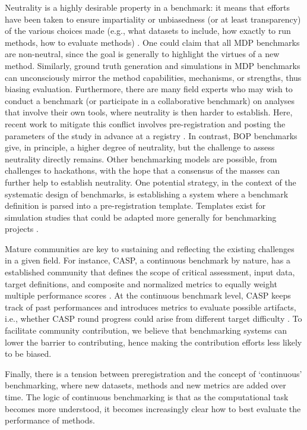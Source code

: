 \documentclass[11pt]{article}
\begin{document}
Neutrality is a highly desirable property in a benchmark: it means that efforts have been taken to ensure impartiality or unbiasedness (or at least transparency) of the various choices made (e.g., what datasets to include, how exactly to run methods, how to evaluate methods) \cite{Weber2019-el, Jelizarow2010-kr}. One could claim that all MDP benchmarks are non-neutral, since the goal is generally to highlight the virtues of a new method. Similarly, ground truth generation and simulations in MDP benchmarks can unconsciously mirror the method capabilities, mechanisms, or strengths, thus biasing evaluation. Furthermore, there are many field experts who may wish to conduct a benchmark (or participate in a collaborative benchmark) on analyses that involve their own tools, where neutrality is then harder to establish. Here, recent work to mitigate this conflict involves pre-registration and posting the parameters of the study in advance at a registry \cite{Sullivan2019-wh, Olevska2021-if, Teo2024-wk}. In contrast, BOP benchmarks give, in principle, a higher degree of neutrality, but the challenge to assess neutrality directly remains. Other benchmarking models are possible, from challenges to hackathons, with the hope that a consensus of the masses can further help to establish neutrality. One potential strategy, in the context of the systematic design of benchmarks, is establishing a system where a benchmark definition is parsed into a pre-registration template. Templates exist for simulation studies that could be adapted more generally for benchmarking projects \cite{Siepe2023-tz}. 

{\color{red}
Mature communities are key to sustaining and reflecting the existing challenges in a given field. For instance, CASP, a continuous benchmark by nature, has a established community that defines the scope of critical assessment, input data, target definitions, and composite and normalized metrics to equally weight multiple performance scores \cite{simpkin2023tertiary}. At the continuous benchmark level, CASP keeps track of past performances and introduces metrics to evaluate possible artifacts, i.e., whether CASP round progress could arise from different target difficulty \cite{kryshtafovych2019critical}. To facilitate community contribution, we believe that benchmarking systems can lower the barrier to contributing, hence making the contribution efforts less likely to be biased. 
}

Finally, there is a tension between preregistration and the concept of `continuous' benchmarking, where new datasets, methods and new metrics are added over time. The logic of continuous benchmarking is that as the computational task becomes more understood, it becomes increasingly clear how to best evaluate the performance of methods. 
\end{document}
